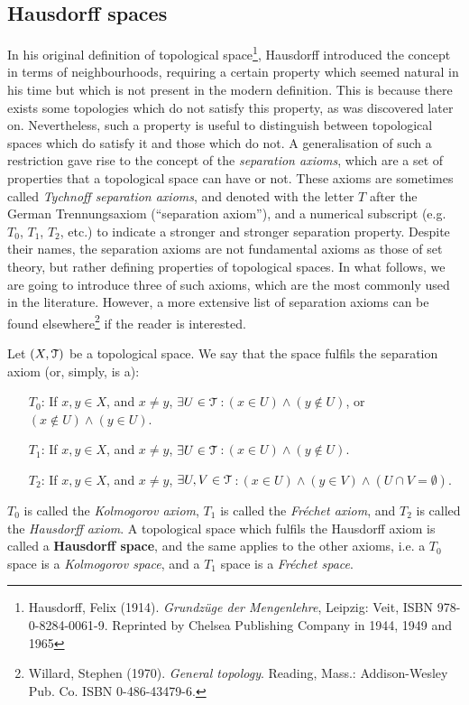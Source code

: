 \subsection{Hausdorff spaces}\label{subsec:hausdorff-spaces}

In his original definition of topological space\footnote{Hausdorff, Felix (1914). \emph{Grundz\"{u}ge der Mengenlehre}, Leipzig: Veit, ISBN 978-0-8284-0061-9. Reprinted by Chelsea Publishing Company in 1944, 1949 and 1965}, Hausdorff introduced the concept in terms of neighbourhoods, requiring a certain property which seemed natural in his time but which is not present in the modern definition.
This is because there exists some topologies which do not satisfy this property, as was discovered later on.
Nevertheless, such a property is useful to distinguish between topological spaces which do satisfy it and those which do not.
A generalisation of such a restriction gave rise to the concept of the \emph{separation axioms}, which are a set of properties that a topological space can have or not.
These axioms are sometimes called \emph{Tychnoff separation axioms}, and denoted with the letter $T$ after the German Trennungsaxiom (``separation axiom''), and a numerical subscript (e.g. $T_0$, $T_1$, $T_2$, etc.) to indicate a stronger and stronger separation property.
Despite their names, the separation axioms are not fundamental axioms as those of set theory, but rather defining properties of topological spaces.
In what follows, we are going to introduce three of such axioms, which are the most commonly used in the literature.
However, a more extensive list of separation axioms can be found elsewhere\footnote{Willard, Stephen (1970). \emph{General topology}. Reading, Mass.: Addison-Wesley Pub. Co. ISBN 0-486-43479-6.} if the reader is interested.

\begin{definition}
	Let $(X, \EuScript{T})$ be a topological space. We say that the space fulfils the separation axiom (or, simply, is a):
	\begin{itemize}
		\item[$T_0$:] If $x,y\in X$, and $x\neq y$, $\exists U\in\EuScript{T}$\,:\,$(x\in U) \land (y\notin U)$, or $(x\notin U) \land (y\in U)$.
		\item[$T_1$:] If $x,y\in X$, and $x\neq y$, $\exists U\in\EuScript{T}$\,:\,$(x\in U)\land (y\notin U)$.
		\item[$T_2$:] If $x,y\in X$, and $x\neq y$, $\exists U,V\in\EuScript{T}$\,:\,$(x\in U)\land (y\in V) \land (U\cap V=\emptyset)$.
	\end{itemize}
	$T_0$ is called the \emph{Kolmogorov axiom}, $T_1$ is called the \emph{Fr\'{e}chet axiom}, and $T_2$ is called the \emph{Hausdorff axiom}.
	A topological space which fulfils the Hausdorff axiom is called a \textbf{Hausdorff space}, and the same applies to the other axioms, i.e. a $T_0$ space is a \emph{Kolmogorov space}, and a $T_1$ space is a \emph{Fr\'{e}chet space}.
\end{definition}

